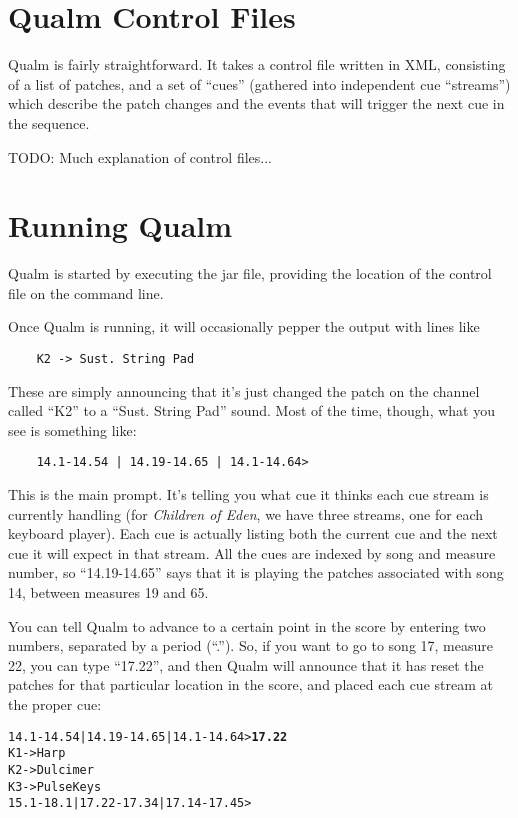 \documentclass{article}
\newcommand{\q}{{\textsf{Qualm}}\xspace}
\begin{document}
\section{\q Control Files}

\q is fairly straightforward.  It takes a control file written in
XML, consisting of a list of patches, and a set of ``cues'' (gathered into
independent cue ``streams'') which describe the patch changes and the
events that will trigger the next cue in the sequence.  

TODO: Much explanation of control files...

\section{Running \q}

\q is started by executing the jar file, providing the location of the
control file on the command line.

Once \q is running, it will occasionally pepper the output with lines
like

\begin{verbatim}
    K2 -> Sust. String Pad
\end{verbatim}

These are simply announcing that it's just changed the patch on the
channel called ``K2'' to a ``Sust. String Pad'' sound.  Most of the time,
though, what you see is something like:

\begin{verbatim}
    14.1-14.54 | 14.19-14.65 | 14.1-14.64>
\end{verbatim}

This is the main prompt.  It's telling you what cue it thinks each cue
stream is currently handling (for {\em Children of Eden}, we have three
streams, one for each keyboard player).  Each cue is actually listing
both the current cue and the next cue it will expect in that stream. 
All the cues are indexed by song and measure number, so ``14.19-14.65''
says that it is playing the patches associated with song 14, between
measures 19 and 65.

You can tell \q to advance to a certain point in the score by
entering two numbers, separated by a period (``.'').  So, if you want to
go to song 17, measure 22, you can type ``17.22'', and then \q will
announce that it has reset the patches for that particular location in
the score, and placed each cue stream at the proper cue:


\begin{alltt}
    14.1-14.54 | 14.19-14.65 | 14.1-14.64> \textbf{17.22}
    K1 -> Harp
    K2 -> Dulcimer
    K3 -> Pulse Keys
    15.1-18.1 | 17.22-17.34 | 17.14-17.45>
\end{alltt}
\end{document}
